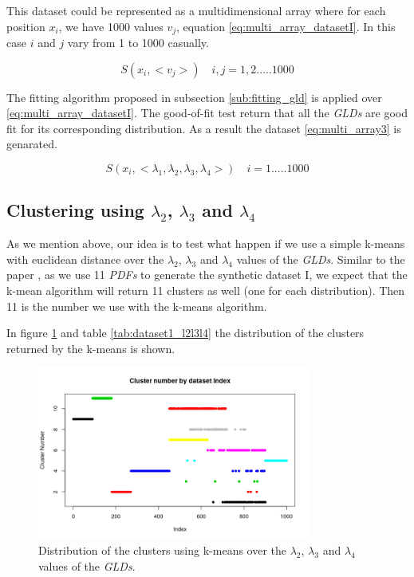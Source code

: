 This dataset could be represented as a multidimensional array where for each position $x_{i}$, we have 1000 values $v_{j}$, equation \ref{eq:multi_array_datasetI}. In this case $i$ and $j$ vary from 1 to 1000 casually.

\begin{equation}\label{eq:multi_array_datasetI}
S(x_{i}, <v_{j}>) \quad i,j=1, 2.....1000
\end{equation}

The fitting algorithm proposed in subsection \ref{sub:fitting_gld} is applied over \ref{eq:multi_array_datasetI}. The good-of-fit test return that all the \textit{GLDs} are good fit for its corresponding distribution. As a result the dataset \ref{eq:multi_array3} is genarated. 

\begin{equation}\label{eq:multi_array3}
S(x_{i}, <\lambda_{1},\lambda_{2},\lambda_{3},\lambda_{4}>) \quad i=1.....1000
\end{equation}

\subsection{Clustering using $\lambda_{2}$, $\lambda_{3}$ and $\lambda_{4}$}\label{syntheticI_l234}

As we mention above, our idea is to test what happen if we use a simple k-means with euclidean distance over the $\lambda_{2}$, $\lambda_{3}$ and $\lambda_{4}$ values of the \textit{GLDs}. Similar to the paper \cite{Jiang2011}, as we use 11 \textit{PDFs} to generate the synthetic dataset I, we expect that the k-mean algorithm will return 11 clusters as well (one for each distribution). Then 11 is the number we use with the k-means algorithm.

In figure \ref{fig:dataset1_l2l3l4} and table \ref{tab:dataset1_l2l3l4} the distribution of the clusters returned by the k-means is shown.

\begin{figure}[H]
    \centering
    \includegraphics[width=0.8\textwidth]{img/gld_clustering/Dataset1/l2_l3_l4/intento_3/normal_exponential_uniform3.png}
    \caption{Distribution of the clusters using k-means over the $\lambda_{2}$, $\lambda_{3}$ and $\lambda_{4}$ values of the \textit{GLDs}.}
    \label{fig:dataset1_l2l3l4}
\end{figure}

